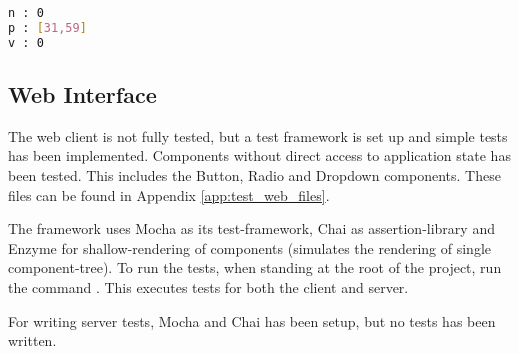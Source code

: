 \begin{lstlisting}[language=sh,caption={Result for primefac.srl},label={lst:primefac_result}]
n : 0
p : [31,59]
v : 0
\end{lstlisting}

\subsection{Web Interface}

The web client is not fully tested, but a test framework is set up and simple tests has been implemented. Components without direct access to application state has been tested. This includes the Button, Radio and Dropdown components.
These files can be found in Appendix \ref{app:test_web_files}.

The framework uses Mocha as its test-framework, Chai as assertion-library and Enzyme for shallow-rendering of components (simulates the rendering of single component-tree).
To run the tests, when standing at the root of the project, run the command .
This executes tests for both the client and server.

For writing server tests, Mocha and Chai has been setup, but no tests has been written.

